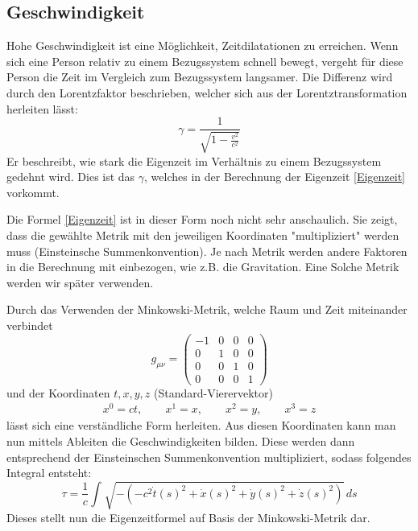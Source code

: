 \begin{refsection}
\subsection{Geschwindigkeit}
Hohe Geschwindigkeit ist eine Möglichkeit, Zeitdilatationen zu erreichen. Wenn sich eine Person relativ zu einem Bezugssystem schnell bewegt, vergeht f\"ur diese Person die Zeit im Vergleich zum Bezugssystem langsamer. Die Differenz wird durch den Lorentzfaktor beschrieben, welcher sich aus der Lorentztransformation herleiten l\"asst:
\begin{equation} \label{lorentzfaktor}
    \gamma=\frac{1}{\sqrt{1-\displaystyle\frac{v^2}{c^2}}} 
\end{equation}
Er beschreibt, wie stark die Eigenzeit im Verhältnis zu einem Bezugssystem gedehnt wird. 
Dies ist das $\gamma$, welches in der Berechnung der Eigenzeit \eqref{Eigenzeit} vorkommt. 

Die Formel \eqref{Eigenzeit} ist in dieser Form noch nicht sehr anschaulich. Sie zeigt, dass die gewählte Metrik mit den jeweiligen Koordinaten "multipliziert" werden muss (Einsteinsche Summenkonvention). Je nach Metrik werden andere Faktoren in die Berechnung mit einbezogen, wie z.B. die Gravitation. Eine Solche Metrik werden wir später verwenden.

Durch das Verwenden der Minkowski-Metrik, welche Raum und Zeit miteinander verbindet 
\begin{equation}
    g_{\mu\nu}=
    \begin{pmatrix}
        -1 & 0 & 0 & 0 \\
        0 & 1 & 0 & 0 \\
        0 & 0 & 1 & 0 \\
        0 & 0 & 0 & 1
    \end{pmatrix}
\end{equation}
und der Koordinaten $t, x, y, z$  (Standard-Vierervektor)
\begin{align*}
x^{0}=ct,\qquad x^{1}=x,\qquad x^{2}=y,\qquad x^{3}=z 
\end{align*}
l\"asst sich eine verst\"andliche Form herleiten.
Aus diesen Koordinaten kann man nun mittels Ableiten die Geschwindigkeiten bilden. Diese werden dann entsprechend der Einsteinschen Summenkonvention multipliziert, sodass folgendes Integral entsteht: 
\begin{equation}\label{minkowski}
    \tau
    =
    \frac{1}{c}\int_{}^{}\sqrt{-(-c^2\dot{t}(s)^{2}+\dot{x}(s)^{2}+\dot{y}(s)^{2}+\dot{z}(s)^{2})}\,ds
\end{equation} 
Dieses stellt nun die Eigenzeitformel auf Basis der Minkowski-Metrik dar.


\end{refsection}
